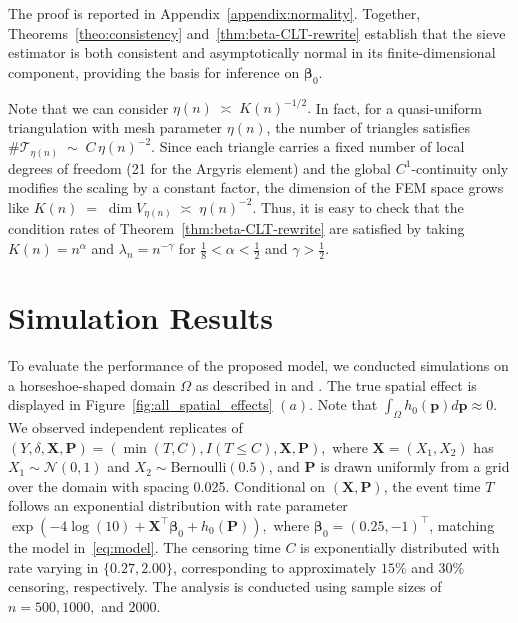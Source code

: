 \documentclass[11pt]{article}
\begin{document}
The proof is reported in Appendix~\ref{appendix:normality}.  
Together, Theorems~\ref{theo:consistency} and~\ref{thm:beta-CLT-rewrite} establish that the sieve estimator is both consistent and asymptotically normal in its finite-dimensional component, providing the basis for inference on $\bm\beta_0$.


Note that we can consider 
\(
\eta(n) \;\asymp\; K(n)^{-1/2}.
\)
In fact, for a quasi-uniform triangulation with mesh parameter $\eta(n)$, 
the number of triangles satisfies 
\(
\#\mathcal{T}_{\eta(n)} \;\sim\; C\, \eta(n)^{-2}.
\)
Since each triangle carries a fixed number of local degrees of freedom 
(21 for the Argyris element) and the global $C^1$-continuity only modifies 
the scaling by a constant factor, the dimension of the FEM space grows like 
\(
K(n) \;=\; \dim V_{\eta(n)} \;\asymp\; \eta(n)^{-2}.
\)
Thus, it is easy to check that the condition rates of Theorem~\ref{thm:beta-CLT-rewrite} are satisfied by taking $K(n) = n^{\alpha}$ and $\lambda_n = n^{-\gamma}$ for $\frac{1}{8}<\alpha <\frac{1}{2}$ and $\gamma >\frac{1}{2}$. 


\section{Simulation Results}\label{sec:simulations}

To evaluate the performance of the proposed model, we conducted simulations on a horseshoe-shaped domain $\Omega$ as described in \cite{ramsay2002spline} and \cite{wood2008soap}. The true spatial effect is displayed in Figure~\ref{fig:all_spatial_effects} $(a)$. %
Note that $\int_{\Omega} h_0(\bm p)d\bm p \approx 0.$ We observed independent replicates of
\(
(Y, \delta, \bm X, \bm P) = \left( \min(T, C),  I(T \le C),  \bm X,  \bm P \right),
\)
where \(\bm X = (X_1, X_2)\) has \(X_1 \sim \mathcal{N}(0,1)\) and \(X_2 \sim \text{Bernoulli}(0.5)\), and \(\bm P\) is drawn uniformly from a grid over the domain with spacing 0.025. Conditional on \((\bm X, \bm P)\), the event time \(T\) follows an exponential distribution with rate parameter
\( \exp(-4 \log(10) + \bm X^\top \bm\beta_0 + h_0(\bm P)), \)
where \(\bm\beta_0 = (0.25, -1)^\top\), matching the model in~\eqref{eq:model}.  
The censoring time \(C\) is exponentially distributed with rate varying in  \( \{0.27, 2.00\}\), corresponding to approximately \(15\%\) and \(30\%\) censoring, respectively. The analysis is conducted using sample sizes of \( n = 500, 1000, \) and \( 2000 \).
\end{document}
